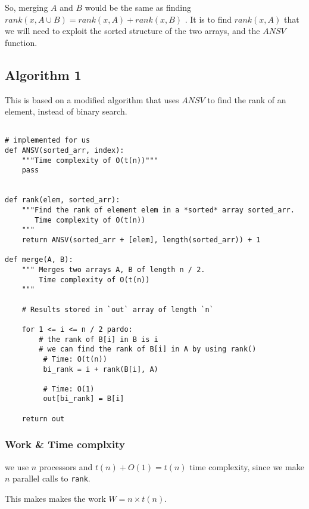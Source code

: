 \documentclass{article}
\begin{document}
So, merging $A$ and $B$ would be the same as finding $rank(x, A \cup B) = rank(x, A) + rank(x, B)$ .
It is to find $rank(x, A)$ that we will need to exploit the sorted structure
of the two arrays, and the $ANSV$ function.

\subsection{Algorithm 1}


This is based on a modified algorithm that uses $ANSV$ to find the rank
of an element, instead of binary search.

\begin{verbatim}

# implemented for us
def ANSV(sorted_arr, index):
    """Time complexity of O(t(n))"""
    pass
    

def rank(elem, sorted_arr):
    """Find the rank of element elem in a *sorted* array sorted_arr.
       Time complexity of O(t(n))
    """
    return ANSV(sorted_arr + [elem], length(sorted_arr)) + 1
    
def merge(A, B):
    """ Merges two arrays A, B of length n / 2.
        Time complexity of O(t(n))
    """

    # Results stored in `out` array of length `n`

    for 1 <= i <= n / 2 pardo:
        # the rank of B[i] in B is i
        # we can find the rank of B[i] in A by using rank()
         # Time: O(t(n))
         bi_rank = i + rank(B[i], A)
         
         # Time: O(1)
         out[bi_rank] = B[i]

    return out
\end{verbatim}


\subsubsection{Work \& Time complxity}
we use $n$ processors and $t(n) + O(1) = t(n)$ time complexity, since we make
$n$ parallel calls to \texttt{rank}.

This makes makes the work $W = n \times t(n)$.
\end{document}
